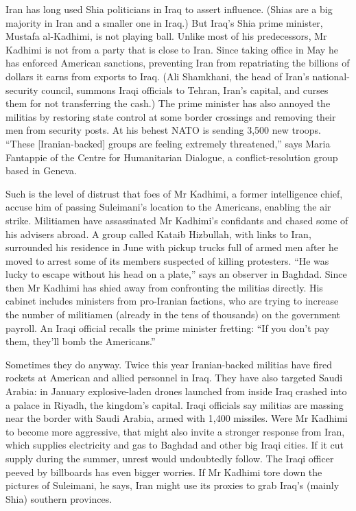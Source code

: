 \documentclass{article}
\begin{document}
Iran has long used Shia politicians in Iraq to assert influence. (Shias are a big majority in Iran and a smaller one in Iraq.) But Iraq's Shia prime minister, Mustafa al-Kadhimi, is not playing ball. Unlike most of his predecessors, Mr Kadhimi is not from a party that is close to Iran. Since taking office in May he has enforced American sanctions, preventing Iran from repatriating the billions of dollars it earns from exports to Iraq. (Ali Shamkhani, the head of Iran's national-security council, summons Iraqi officials to Tehran, Iran's capital, and curses them for not transferring the cash.) The prime minister has also annoyed the militias by restoring state control at some border crossings and removing their men from security posts. At his behest NATO is sending 3,500 new troops. ``These {[}Iranian-backed{]} groups are feeling extremely threatened,'' says Maria Fantappie of the Centre for Humanitarian Dialogue, a conflict-resolution group based in Geneva. 

Such is the level of distrust that foes of Mr Kadhimi, a former intelligence chief, accuse him of passing Suleimani's location to the Americans, enabling the air strike. Militiamen have assassinated Mr Kadhimi's confidants and chased some of his advisers abroad. A group called Kataib Hizbullah, with links to Iran, surrounded his residence in June with pickup trucks full of armed men after he moved to arrest some of its members suspected of killing protesters. ``He was lucky to escape without his head on a plate,'' says an observer in Baghdad. Since then Mr Kadhimi has shied away from confronting the militias directly. His cabinet includes ministers from pro-Iranian factions, who are trying to increase the number of militiamen (already in the tens of thousands) on the government payroll. An Iraqi official recalls the prime minister fretting: ``If you don't pay them, they'll bomb the Americans.'' 

Sometimes they do anyway. Twice this year Iranian-backed militias have fired rockets at American and allied personnel in Iraq. They have also targeted Saudi Arabia: in January explosive-laden drones launched from inside Iraq crashed into a palace in Riyadh, the kingdom's capital. Iraqi officials say militias are massing near the border with Saudi Arabia, armed with 1,400 missiles. Were Mr Kadhimi to become more aggressive, that might also invite a stronger response from Iran, which supplies electricity and gas to Baghdad and other big Iraqi cities. If it cut supply during the summer, unrest would undoubtedly follow. The Iraqi officer peeved by billboards has even bigger worries. If Mr Kadhimi tore down the pictures of Suleimani, he says, Iran might use its proxies to grab Iraq's (mainly Shia) southern provinces. 
\end{document}
